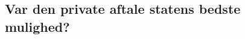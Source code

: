\documentclass{article}
\begin{document}
%
%

\subsection{Var den private aftale statens bedste mulighed?}
\end{document}
